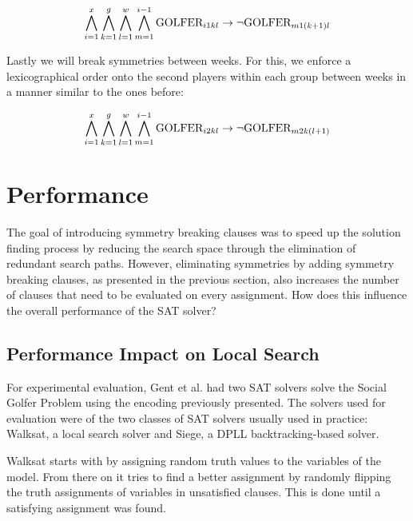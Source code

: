 \documentclass[a4paper]{scrartcl}
\begin{document}
\begin{equation}
\centering
    \bigwedge \limits_{i=1}^x
    \bigwedge \limits_{k=1}^g
    \bigwedge \limits_{l=1}^w
    \bigwedge \limits_{m=1}^{i-1}
    \text{GOLFER}_{i1kl}
    \to
    \neg \text{GOLFER}_{m1(k+1)l}
\end{equation}

Lastly we will break symmetries between weeks. For this, we enforce a lexicographical order onto the second players within each group between weeks in a manner similar to the ones before:

\begin{equation}
\centering
    \bigwedge \limits_{i=1}^x
    \bigwedge \limits_{k=1}^g
    \bigwedge \limits_{l=1}^w
    \bigwedge \limits_{m=1}^{i-1}
    \text{GOLFER}_{i2kl}
    \to
    \neg \text{GOLFER}_{m2k(l+1)}
\end{equation}


\section{Performance}

The goal of introducing symmetry breaking clauses was to speed up the solution finding process by reducing the search space through the elimination of redundant search paths. However, eliminating symmetries by adding symmetry breaking clauses, as presented in the previous section, also increases the number of clauses that need to be evaluated on every assignment. How does this influence the overall performance of the SAT solver?


\subsection{Performance Impact on Local Search}

For experimental evaluation, Gent et al.\cite{Gent05} had two SAT solvers solve the Social Golfer Problem using the encoding previously presented. The solvers used for evaluation were of the two classes of SAT solvers usually used in practice: Walksat\cite{walksat2004}, a local search solver and Siege\cite{Ryan04}, a DPLL backtracking-based solver.

Walksat starts with by assigning random truth values to the variables of the model. From there on it tries to find a better assignment by randomly flipping the truth assignments of variables in unsatisfied clauses. This is done until a satisfying assignment was found.
\end{document}
